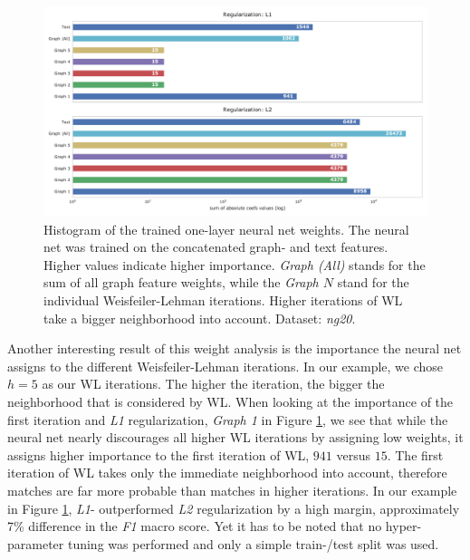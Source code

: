 \begin{figure}[htb!]
	\centering
	{\includegraphics[width=\linewidth]{assets/figures/combined_coefs_l1_l2_regularization.pdf}%
		\caption[Statistics: Histogram of the trained weights of a one-layer neural net]{%
			Histogram of the trained one-layer neural net weights. The neural net was trained on the concatenated graph- and text features.
			Higher values indicate higher importance.
			\textit{Graph (All)} stands for the sum of all graph feature weights, while the \textit{Graph $N$} stand for the individual Weisfeiler-Lehman iterations.
			Higher iterations of WL take a bigger neighborhood into account.
			Dataset: \textit{ng20}.
		}%
		\label{fig:combined_coefs_l1_l2_regularization}}
\end{figure}

Another interesting result of this weight analysis is the importance the neural net assigns to the different Weisfeiler-Lehman iterations. In our example, we chose $h = 5$ as our WL iterations. The higher the iteration, the bigger the neighborhood that is considered by WL.
When looking at the importance of the first iteration and \textit{L1} regularization, \textit{Graph 1} in Figure \ref{fig:combined_coefs_l1_l2_regularization}, we see that while the neural net nearly discourages all higher WL iterations by assigning low weights, it assigns higher importance to the first iteration of WL, $941$ versus $15$.
The first iteration of WL takes only the immediate neighborhood into account, therefore matches are far more probable than matches in higher iterations.
In our example in Figure \ref{fig:combined_coefs_l1_l2_regularization}, \textit{L1}- outperformed \textit{L2} regularization by a high margin, approximately 7\% difference in the \textit{F1} macro score.
Yet it has to be noted that no hyper-parameter tuning was performed and only a simple train-/test split was used.

